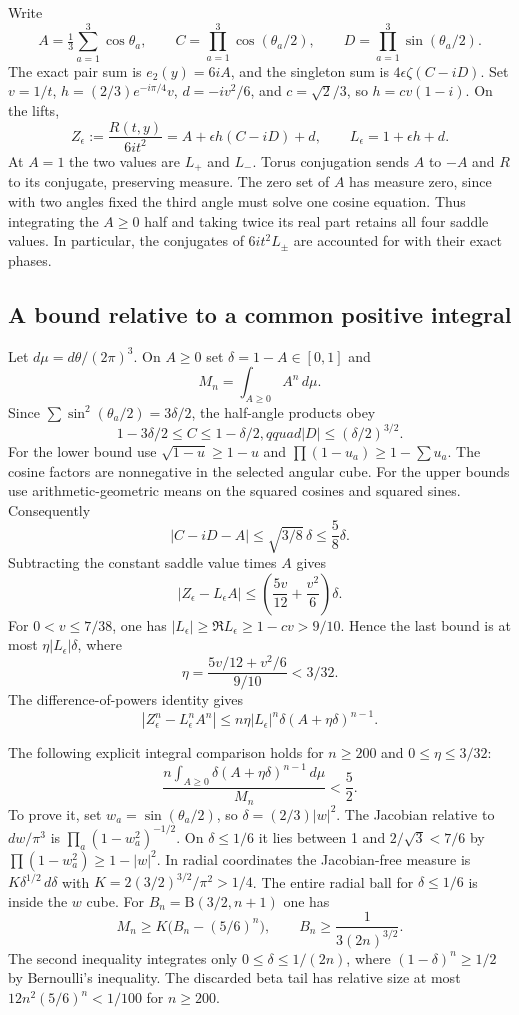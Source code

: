 \documentclass[11pt]{article}
\begin{document}
Write
\[
A=\tfrac13\sum_{a=1}^3\cos\theta_a,\qquad
C=\prod_{a=1}^3\cos(\theta_a/2),\qquad
D=\prod_{a=1}^3\sin(\theta_a/2).
\]
The exact pair sum is $e_2(y)=6iA$, and the singleton sum is $4\epsilon\zeta(C-iD)$. Set $v=1/t$, $h=(2/3)e^{-i\pi/4}v$, $d=-iv^2/6$, and $c=\sqrt2/3$, so $h=cv(1-i)$. On the lifts,
\[
Z_\epsilon:=\frac{R(t,y)}{6it^2}=A+\epsilon h(C-iD)+d,
\qquad L_\epsilon=1+\epsilon h+d.
\]
At $A=1$ the two values are $L_+$ and $L_-$. Torus conjugation sends $A$ to $-A$ and $R$ to its conjugate, preserving measure. The zero set of $A$ has measure zero, since with two angles fixed the third angle must solve one cosine equation. Thus integrating the $A\ge0$ half and taking twice its real part retains all four saddle values. In particular, the conjugates of $6it^2L_\pm$ are accounted for with their exact phases.

\subsection{A bound relative to a common positive integral}
\label{sec:a-bound-relative-to-a-common-positive-integral}

Let $d\mu=d\theta/(2\pi)^3$. On $A\ge0$ set $\delta=1-A\in[0,1]$ and
\[
M_n=\int_{A\ge0} A^n\,d\mu .
\]
Since $\sum \sin^2(\theta_a/2)=3\delta/2$, the half-angle products obey
\[
1-3\delta/2\le C\le 1-\delta/2,qquad |D|\le(\delta/2)^{3/2}.
\]
For the lower bound use $\sqrt{1-u}\ge 1-u$ and $\prod(1-u_a)\ge1-\sum u_a$. The cosine factors are nonnegative in the selected angular cube. For the upper bounds use arithmetic-geometric means on the squared cosines and squared sines. Consequently
\[
|C-iD-A|\le \sqrt{3/8}\,\delta\le\frac58\delta .
\]
Subtracting the constant saddle value times $A$ gives
\[
|Z_\epsilon-L_\epsilon A|
\le\left(\frac{5v}{12}+\frac{v^2}{6}\right)\delta .
\]
For $0<v\le 7/38$, one has $|L_\epsilon|\ge\Re L_\epsilon\ge1-cv>9/10$. Hence the last bound is at most $\eta|L_\epsilon|\delta$, where
\[
\eta=\frac{5v/12+v^2/6}{9/10}<3/32 .
\]
The difference-of-powers identity gives
\[
|Z_\epsilon^n-L_\epsilon^nA^n|
\le n\eta|L_\epsilon|^n\delta(A+\eta\delta)^{n-1}.
\]

The following explicit integral comparison holds for $n\ge200$ and $0\le\eta\le3/32$:
\[
\frac{n\int_{A\ge0}\delta(A+\eta\delta)^{n-1}\,d\mu}{M_n}<\frac52 .
\tag{7}
\]
To prove it, set $w_a=\sin(\theta_a/2)$, so $\delta=(2/3)|w|^2$. The Jacobian relative to $dw/\pi^3$ is $\prod_a(1-w_a^2)^{-1/2}$. On $\delta\le1/6$ it lies between 1 and $2/\sqrt3<7/6$ by $\prod(1-w_a^2)\ge1-|w|^2$. In radial coordinates the Jacobian-free measure is $K\delta^{1/2}\,d\delta$ with $K=2(3/2)^{3/2}/\pi^2>1/4$. The entire radial ball for $\delta\le1/6$ is inside the $w$ cube. For $B_n=\mathrm B(3/2,n+1)$ one has
\[
M_n\ge K\big(B_n-(5/6)^n\big),\qquad B_n\ge\frac1{3(2n)^{3/2}}.
\]
The second inequality integrates only $0\le\delta\le1/(2n)$, where $(1-\delta)^n\ge1/2$ by Bernoulli's inequality. The discarded beta tail has relative size at most $12n^2(5/6)^n<1/100$ for $n\ge200$.
\end{document}
